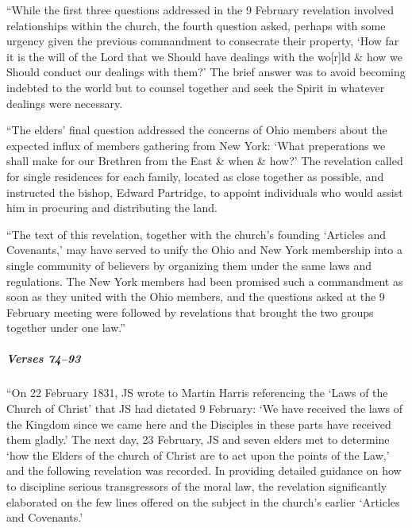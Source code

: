 				``While the first three questions addressed in the 9 February revelation involved relationships within the church, the fourth question asked, perhaps with some urgency given the previous commandment to consecrate their property, `How far it is the will of the Lord that we Should have dealings with the wo[r]ld \& how we Should conduct our dealings with them?' The brief answer was to avoid becoming indebted to the world but to counsel together and seek the Spirit in whatever dealings were necessary.

				``The elders' final question addressed the concerns of Ohio members about the expected influx of members gathering from New York: `What preperations we shall make for our Brethren from the East \& when \& how?' The revelation called for single residences for each family, located as close together as possible, and instructed the bishop, Edward Partridge, to appoint individuals who would assist him in procuring and distributing the land.

				``The text of this revelation, together with the church's founding `Articles and Covenants,' may have served to unify the Ohio and New York membership into a single community of believers by organizing them under the same laws and regulations. The New York members had been promised such a commandment as soon as they united with the Ohio members, and the questions asked at the 9 February meeting were followed by revelations that brought the two groups together under one law.''

			\subparagraph{Verses 74--93}

				``On 22 February 1831, JS wrote to Martin Harris referencing the `Laws of the Church of Christ' that JS had dictated 9 February: `We have received the laws of the Kingdom since we came here and the Disciples in these parts have received them gladly.' The next day, 23 February, JS and seven elders met to determine `how the Elders of the church of Christ are to act upon the points of the Law,' and the following revelation was recorded. In providing detailed guidance on how to discipline serious transgressors of the moral law, the revelation significantly elaborated on the few lines offered on the subject in the church's earlier `Articles and Covenants.'
				

